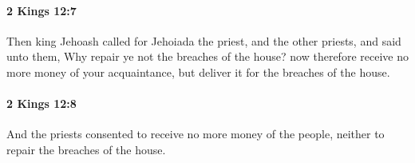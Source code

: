 		\paragraph{2 Kings 12:7} %
			\label{2KINGS-12-7}

			Then king Jehoash called for Jehoiada the priest, and the other priests, and said unto them, Why repair ye not the breaches of the house? now therefore receive no more money of your acquaintance, but deliver it for the breaches of the house.


		\paragraph{2 Kings 12:8} %
			\label{2KINGS-12-8}

			And the priests consented to receive no more money of the people, neither to repair the breaches of the house.



